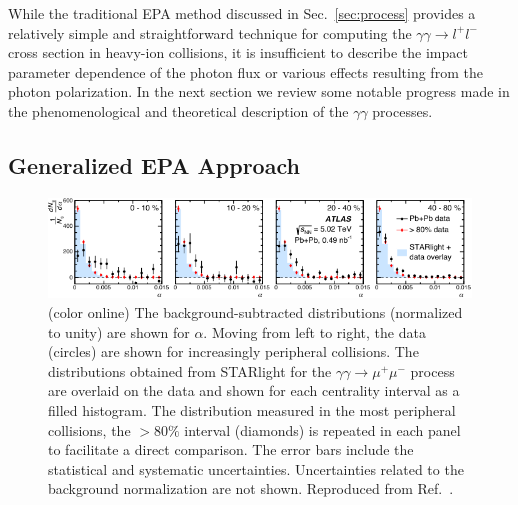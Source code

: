 \documentclass[12pt,epjc3]{svjour3}\sloppy
\begin{document}
While the traditional EPA method discussed in Sec.~\ref{sec:process} provides a relatively simple and straightforward technique for computing the $\gamma\gamma \rightarrow l^+l^-$ cross section in heavy-ion collisions, it is insufficient to describe the impact parameter dependence of the photon flux or various effects resulting from the photon polarization. In the next section we review some notable progress made in the phenomenological and theoretical description of the $\gamma\gamma$ processes.

\subsection{Generalized EPA Approach}

\begin{figure}
    \centering
      \includegraphics[width=.99\linewidth]{fig/fig_13-crop.pdf}
 
    \caption{ (color online) The background-subtracted distributions (normalized to unity) are shown for $\alpha$. Moving from left to right, the data (circles) are shown for increasingly peripheral collisions. The distributions obtained from STARlight for the $\gamma\gamma \rightarrow \mu^+\mu^-$ process are overlaid on the data and shown for each centrality interval as a filled histogram. The distribution measured in the most peripheral collisions, the $> 80\%$ interval (diamonds) is repeated in each panel to facilitate a direct comparison. The error bars include the statistical and systematic uncertainties. Uncertainties related to the background normalization are not shown. Reproduced from Ref.~\cite{atlascollaborationObservationCentralityDependentAcoplanarity2018a}.
    }
    \label{fig:exp_atlas}
\end{figure}
\end{document}
